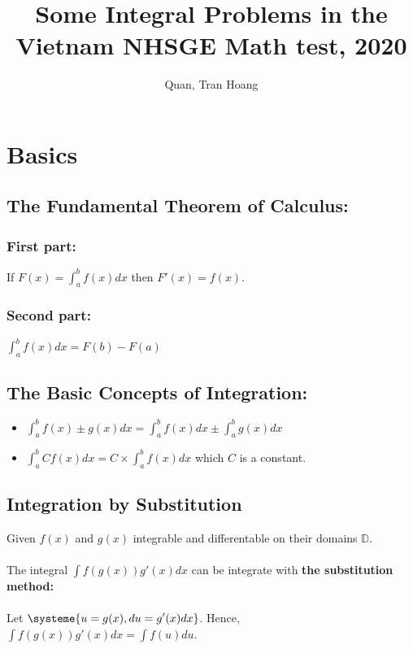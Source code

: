 \documentclass{article}
\begin{document}
    \title{Some Integral Problems in the Vietnam NHSGE Math test, 2020}
    \author{Quan, Tran Hoang}
    \maketitle

    \section{Basics}

    \subsection{The Fundamental Theorem of Calculus:}
    \subsubsection{First part:}
    If $\displaystyle F(x) = \int_{a}^{b} f(x) dx$ then $\displaystyle F'(x) = f(x)$.

    \subsubsection{Second part:}
    $\displaystyle \int_{a}^{b} f(x) dx = F(b) - F(a)$

    \subsection{The Basic Concepts of Integration:}

    \begin{itemize}
        \item $\displaystyle \int_{a}^{b} f(x) \pm g(x) dx = \int_{a}^{b} f(x) dx \pm \int_{a}^{b} g(x) dx$
        \item $\displaystyle \int_{a}^{b} Cf(x) dx = C\times\int_{a}^{b} f(x) dx$ which $C$ is a constant.
    \end{itemize}

    \subsection{Integration by Substitution}
    Given $f(x)$ and $g(x)$ integrable and differentable on their domains $\mathbb{D}$.\\\\
    The integral $\displaystyle \int f(g(x))g'(x)dx$ can be integrate with \textbf{the substitution method:}\\\\
    Let $\displaystyle \systeme{u = g(x), du = g'(x) dx}$. Hence, $\displaystyle \int f(g(x))g'(x)dx = \int f(u) du$.
\end{document}
